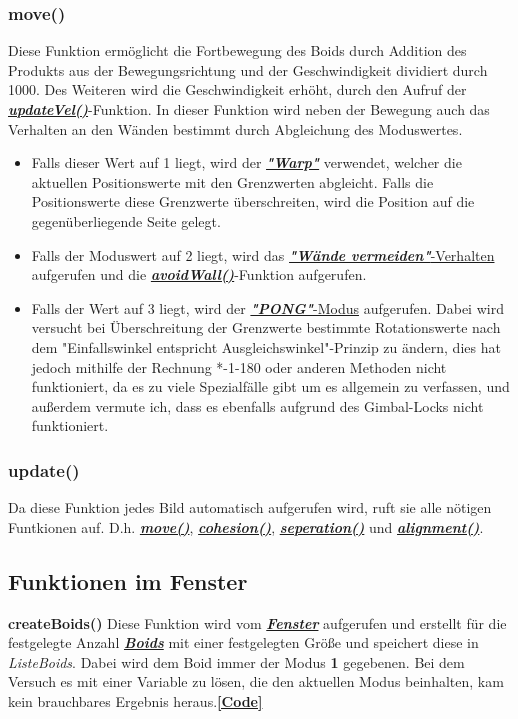 \documentclass[a4paper, hidelinks, 12pt]{article}
\begin{document}
\normalsize\subsubsection{move()}\label{Umsetzungmove}
Diese Funktion ermöglicht die Fortbewegung des Boids durch Addition des Produkts aus der Bewegungsrichtung und der Geschwindigkeit dividiert durch 1000. Des Weiteren wird die Geschwindigkeit erhöht, durch den Aufruf der \hyperref[UmsetzungupdateVel]{\textbf{\emph{updateVel()}}}-Funktion.
In dieser Funktion wird neben der Bewegung auch das Verhalten an den Wänden bestimmt durch Abgleichung des Moduswertes.\newline
\begin{itemize}
\item Falls dieser Wert auf 1 liegt, wird der \hyperref[IdeeWarp]{\textbf{\emph{"Warp"}}} verwendet, welcher die aktuellen Positionswerte mit den Grenzwerten abgleicht. Falls die Positionswerte diese Grenzwerte überschreiten, wird die Position auf die gegenüberliegende Seite gelegt.
\item Falls der Moduswert auf 2 liegt, wird das \hyperref[IdeeAvoidWall]{\textbf{\emph{"Wände vermeiden"}}-Verhalten} aufgerufen und die \hyperref[UmsetzungavoidWall]{\textbf{\emph{avoidWall()}}}-Funktion aufgerufen.
\item Falls der Wert auf 3 liegt, wird der \hyperref[IdeePong]{\textbf{\emph{"PONG"}}-Modus} aufgerufen. Dabei wird versucht bei Überschreitung der Grenzwerte bestimmte Rotationswerte nach dem "Einfallswinkel entspricht Ausgleichswinkel"-Prinzip zu ändern, dies hat jedoch mithilfe der Rechnung *-1-180 oder anderen Methoden\cite{Space2022} nicht funktioniert, da es zu viele Spezialfälle gibt um es allgemein zu verfassen, und außerdem vermute ich, dass es ebenfalls aufgrund des Gimbal-Locks\cite{2022o} nicht funktioniert.
\end{itemize}
		
\subsubsection{update()}\label{Umsetzungupdate}
Da diese Funktion jedes Bild automatisch aufgerufen wird\cite{update}, ruft sie alle nötigen Funtkionen auf. D.h. \hyperref[Umsetzungmove]{\textbf{\emph{move()}}}, \hyperref[Umsetzungcohesion]{\textbf{\emph{cohesion()}}}, \hyperref[Umsetzungseperation]{\textbf{\emph{seperation()}}} und \hyperref[Umsetzungalignment]{\textbf{\emph{alignment()}}}.
			
\subsection{Funktionen im Fenster}
\textbf{createBoids()}\label{UmsetzungcreateBoids}
Diese Funktion wird vom \hyperref[UmsetzungFenster]{\textbf{\emph{Fenster}}} aufgerufen und erstellt für die festgelegte Anzahl \hyperref[UmsetzungBoid]{\textbf{\emph{Boids}}} mit einer festgelegten Größe und speichert diese in \emph{Liste\textunderscore Boids}. Dabei wird dem Boid immer der Modus \textbf{1} gegebenen. Bei dem Versuch es mit einer Variable zu lösen, die den aktuellen Modus beinhalten, kam kein brauchbares Ergebnis heraus.\hyperref[CodecreateBoids]{\textbf{[Code]}}
			
\end{document}
